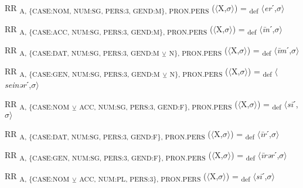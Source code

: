{\begin{exe}
 RR \textsubscript{A, \{CASE:NOM, NUM:SG, PERS:3, GEND:M\}, PRON.PERS} ($\langle$X,$\sigma $$\rangle$) = \textsubscript{def} $\langle$\textit{er}ˊ,$\sigma $$\rangle$
\end{exe}

\begin{exe}
 RR \textsubscript{A, \{CASE:ACC, NUM:SG, PERS:3, GEND:M\}, PRON.PERS} ($\langle$X,$\sigma $$\rangle$) = \textsubscript{def} $\langle$\textit{\=in}ˊ,$\sigma $$\rangle$
\end{exe}

\begin{exe}
 RR \textsubscript{A, \{CASE:DAT, NUM:SG, PERS:3, GEND:M} \textsubscript{${\veebar}$}\textsubscript{ N\}, PRON.PERS} ($\langle$X,$\sigma $$\rangle$) = \textsubscript{def} $\langle$\textit{\=im}ˊ,$\sigma $$\rangle$
\end{exe}

\begin{exe}
 RR \textsubscript{A, \{CASE:GEN, NUM:SG, PERS:3, GEND:M} \textsubscript{${\veebar}$}\textsubscript{ N\}, PRON.PERS} ($\langle$X,$\sigma $$\rangle$) = \textsubscript{def} $\langle$\textit{seinər}ˊ,$\sigma $$\rangle$
\end{exe}

\begin{exe}
 RR \textsubscript{A, \{CASE:NOM} \textsubscript{${\veebar}$}\textsubscript{ ACC, NUM:SG, PERS:3, GEND:F\}, PRON.PERS} ($\langle$X,$\sigma $$\rangle$) = \textsubscript{def} $\langle$\textit{s\=i}ˊ,$\sigma $$\rangle$
\end{exe}

\begin{exe}
 RR \textsubscript{A, \{CASE:DAT, NUM:SG, PERS:3, GEND:F\}, PRON.PERS} ($\langle$X,$\sigma $$\rangle$) = \textsubscript{def} $\langle$\textit{\=ir}ˊ,$\sigma $$\rangle$
\end{exe}

\begin{exe}
 RR \textsubscript{A, \{CASE:GEN, NUM:SG, PERS:3, GEND:F\}, PRON.PERS} ($\langle$X,$\sigma $$\rangle$) = \textsubscript{def} $\langle$\textit{\=irər}ˊ,$\sigma $$\rangle$
\end{exe}

\begin{exe}
 RR \textsubscript{A, \{CASE:NOM} \textsubscript{${\veebar}$}\textsubscript{ ACC, NUM:PL, PERS:3\}, PRON.PERS} ($\langle$X,$\sigma $$\rangle$) = \textsubscript{def} $\langle$\textit{s\=i}ˊ,$\sigma $$\rangle$
\end{exe}

}
